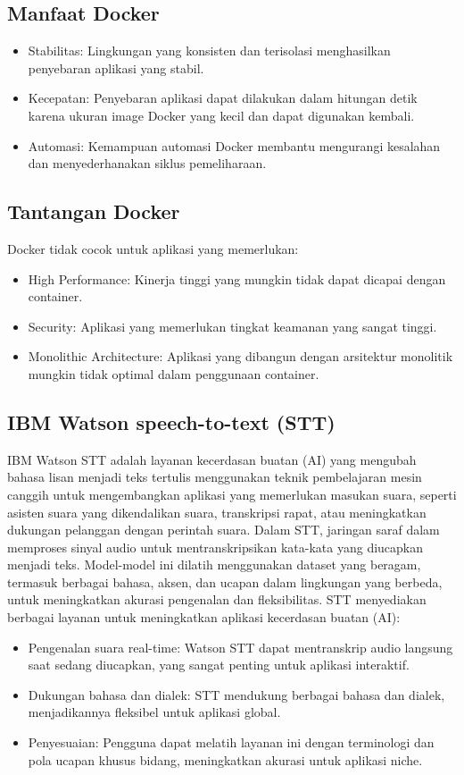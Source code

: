 \documentclass{article}
\begin{document}
\subsection{Manfaat Docker}
\begin{itemize}
    \item Stabilitas: Lingkungan yang konsisten dan terisolasi menghasilkan penyebaran aplikasi yang stabil.
    \item Kecepatan: Penyebaran aplikasi dapat dilakukan dalam hitungan detik karena ukuran image Docker yang kecil dan dapat digunakan kembali.
    \item Automasi: Kemampuan automasi Docker membantu mengurangi kesalahan dan menyederhanakan siklus pemeliharaan.
\end{itemize}

\subsection{Tantangan Docker}
Docker tidak cocok untuk aplikasi yang memerlukan:
\begin{itemize}
    \item High Performance: Kinerja tinggi yang mungkin tidak dapat dicapai dengan container.
    \item Security: Aplikasi yang memerlukan tingkat keamanan yang sangat tinggi.
    \item Monolithic Architecture: Aplikasi yang dibangun dengan arsitektur monolitik mungkin tidak optimal dalam penggunaan container.
\end{itemize}

\subsection{IBM Watson speech-to-text (STT)}
IBM Watson STT adalah layanan kecerdasan buatan (AI) yang mengubah bahasa lisan menjadi teks tertulis menggunakan teknik pembelajaran mesin canggih untuk mengembangkan aplikasi yang memerlukan masukan suara, seperti asisten suara yang dikendalikan suara, transkripsi rapat, atau meningkatkan dukungan pelanggan dengan perintah suara. Dalam STT, jaringan saraf dalam memproses sinyal audio untuk mentranskripsikan kata-kata yang diucapkan menjadi teks. Model-model ini dilatih menggunakan dataset yang beragam, termasuk berbagai bahasa, aksen, dan ucapan dalam lingkungan yang berbeda, untuk meningkatkan akurasi pengenalan dan fleksibilitas.
STT menyediakan berbagai layanan untuk meningkatkan aplikasi kecerdasan buatan (AI):
\begin{itemize}
    \item Pengenalan suara real-time: Watson STT dapat mentranskrip audio langsung saat sedang diucapkan, yang sangat penting untuk aplikasi interaktif.
    \item Dukungan bahasa dan dialek: STT mendukung berbagai bahasa dan dialek, menjadikannya fleksibel untuk aplikasi global.
    \item Penyesuaian: Pengguna dapat melatih layanan ini dengan terminologi dan pola ucapan khusus bidang, meningkatkan akurasi untuk aplikasi niche.
\end{itemize}
\end{document}
